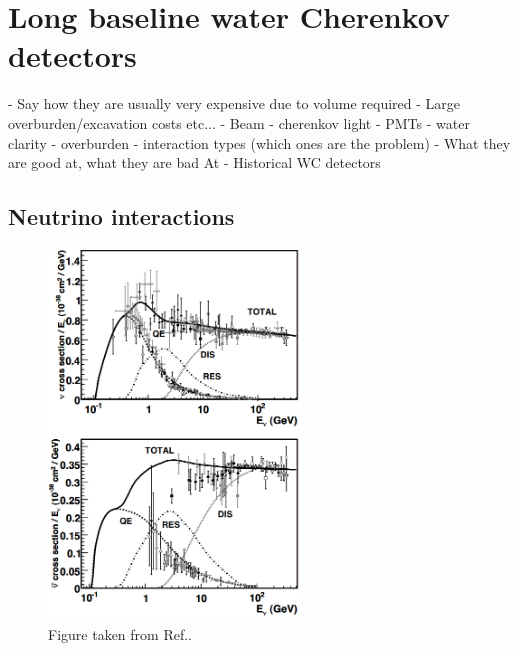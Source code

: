 \chapter{Long baseline water Cherenkov detectors} %
\label{chap:exp} %

- Say how they are usually very expensive due to volume required
- Large overburden/excavation costs etc...
- Beam
- cherenkov light
- PMTs
- water clarity
- overburden
- interaction types (which ones are the problem)
- What they are good at, what they are bad At
- Historical WC detectors

\section{Neutrino interactions} %
\label{sec:exp_interactions} %

\begin{figure} %
    \includegraphics[origin=c,width=0.6\textwidth]{diagrams/4-exp/cross_sections.png}
    \caption[cross sections short]
    {Figure taken from Ref.\cite{formaggio2012}.}
    \label{fig:cross_sections}
\end{figure}

